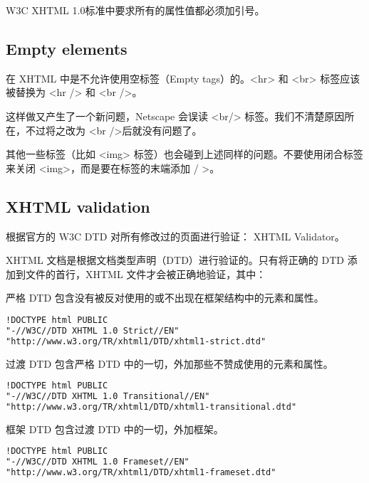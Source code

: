 W3C XHTML 1.0标准中要求所有的属性值都必须加引号。


\subsection{Empty elements}

在 XHTML 中是不允许使用空标签（Empty tags）的。<hr> 和 <br> 标签应该被替换为 <hr /> 和 <br />。

这样做又产生了一个新问题，Netscape 会误读 <br/> 标签。我们不清楚原因所在，不过将之改为 <br />后就没有问题了。

其他一些标签（比如 <img> 标签）也会碰到上述同样的问题。不要使用闭合标签来关闭 <img>，而是要在标签的末端添加 / >。


\subsection{XHTML validation}

根据官方的 W3C DTD 对所有修改过的页面进行验证： XHTML Validator。

XHTML 文档是根据文档类型声明（DTD）进行验证的。只有将正确的 DTD 添加到文件的首行，XHTML 文件才会被正确地验证，其中：

\begin{compactenum}
\item 严格 DTD 包含没有被反对使用的或不出现在框架结构中的元素和属性。

\begin{lstlisting}[language=HTML]
!DOCTYPE html PUBLIC
"-//W3C//DTD XHTML 1.0 Strict//EN"
"http://www.w3.org/TR/xhtml1/DTD/xhtml1-strict.dtd"
\end{lstlisting}

\item 过渡 DTD 包含严格 DTD 中的一切，外加那些不赞成使用的元素和属性。

\begin{lstlisting}[language=HTML]
!DOCTYPE html PUBLIC
"-//W3C//DTD XHTML 1.0 Transitional//EN"
"http://www.w3.org/TR/xhtml1/DTD/xhtml1-transitional.dtd"
\end{lstlisting}

\item 框架 DTD 包含过渡 DTD 中的一切，外加框架。

\begin{lstlisting}[language=HTML]
!DOCTYPE html PUBLIC
"-//W3C//DTD XHTML 1.0 Frameset//EN"
"http://www.w3.org/TR/xhtml1/DTD/xhtml1-frameset.dtd"
\end{lstlisting}

\end{compactenum}



